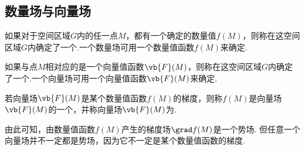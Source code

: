\subsection{数量场与向量场}
\begin{definition}
如果对于空间区域\(G\)内的任一点\(M\)，都有一个确定的数量值\(f(M)\)，则称在这空间区域\(G\)内确定了一个.一个数量场可用一个数量值函数\(f(M)\)来确定.

如果与点\(M\)相对应的是一个向量值函数\(\vb{F}(M)\)，则称在这空间区域\(G\)内确定了一个.一个向量场可用一个向量值函数\(\vb{F}(M)\)来确定.

若向量场\(\vb{F}(M)\)是某个数量值函数\(f(M)\)的梯度，则称\(f(M)\)是向量场\(\vb{F}(M)\)的一个，并称向量场\(\vb{F}(M)\)为.
\end{definition}
由此可知，由数量值函数\(f(M)\)产生的梯度场\(\grad f(M)\)是一个势场.
但任意一个向量场并不一定都是势场，因为它不一定是某个数量值函数的梯度.
